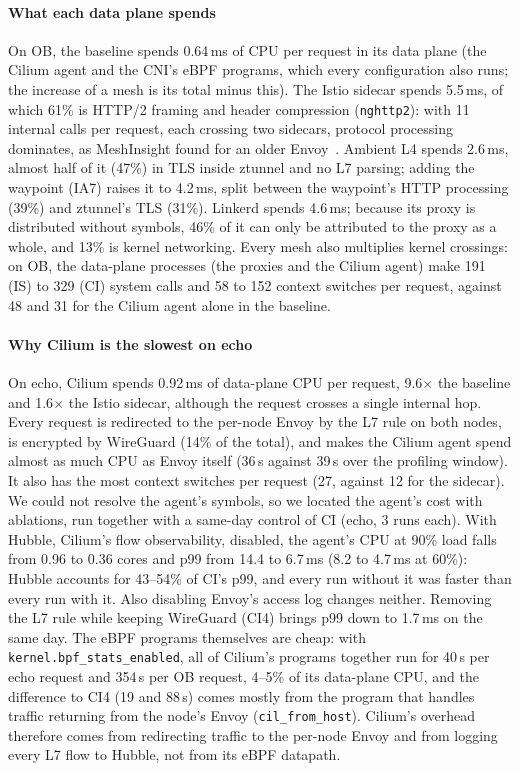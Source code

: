 \paragraph{What each data plane spends}
On OB, the baseline spends 0.64\,ms of CPU per request in its data plane (the
Cilium agent and the CNI's eBPF programs, which every configuration also
runs; the increase of a mesh is its total minus this). The Istio sidecar spends 5.5\,ms, of which 61\% is
HTTP/2 framing and header compression (\texttt{nghttp2}): with 11 internal
calls per request, each crossing two sidecars, protocol processing dominates,
as MeshInsight found for an older Envoy~\cite{zhu2023meshinsight}. Ambient L4
spends 2.6\,ms, almost half of it (47\%) in TLS inside ztunnel and no L7
parsing; adding the waypoint (IA7) raises it to 4.2\,ms, split between the
waypoint's HTTP processing (39\%) and ztunnel's TLS (31\%). Linkerd spends
4.6\,ms; because its proxy is distributed without symbols, 46\% of it can only
be attributed to the proxy as a whole, and 13\% is kernel networking. Every
mesh also multiplies kernel crossings: on OB, the data-plane processes (the
proxies and the Cilium agent) make 191 (IS) to 329 (CI) system calls and 58 to
152 context switches per request, against 48 and 31 for the Cilium agent alone
in the baseline.

\paragraph{Why Cilium is the slowest on echo}
On echo, Cilium spends 0.92\,ms of data-plane CPU per request, 9.6$\times$ the
baseline and 1.6$\times$ the Istio sidecar, although the request crosses a
single internal hop. Every request is redirected to the per-node Envoy by the
L7 rule on both nodes, is encrypted by WireGuard (14\% of the total), and makes
the Cilium agent spend almost as much CPU as Envoy itself (36\,s against 39\,s
over the profiling window). It also has the most context switches per request
(27, against 12 for the sidecar). We could not resolve the agent's symbols, so
we located the agent's cost with ablations, run together with a same-day
control of CI (echo, 3 runs each). With Hubble, Cilium's flow observability,
disabled, the agent's CPU at 90\% load falls from 0.96 to 0.36 cores and p99
from 14.4 to 6.7\,ms (8.2 to 4.7\,ms at 60\%): Hubble accounts for 43--54\%
of CI's p99, and every run without it was faster than every run with it. Also
disabling Envoy's access log changes neither. Removing the L7 rule while
keeping WireGuard (CI4) brings p99 down to 1.7\,ms on the same day. The eBPF programs themselves are cheap: with
\texttt{kernel.bpf\_stats\_enabled}, all of Cilium's programs together run
for 40\,\textmu s per echo request and 354\,\textmu s per OB request, 4--5\%
of its data-plane CPU, and the difference to CI4 (19 and 88\,\textmu s) comes
mostly from the program that handles traffic returning from the node's Envoy
(\texttt{cil\_from\_host}). Cilium's overhead therefore comes from redirecting
traffic to the per-node Envoy and from logging every L7 flow to Hubble, not from
its eBPF datapath.

